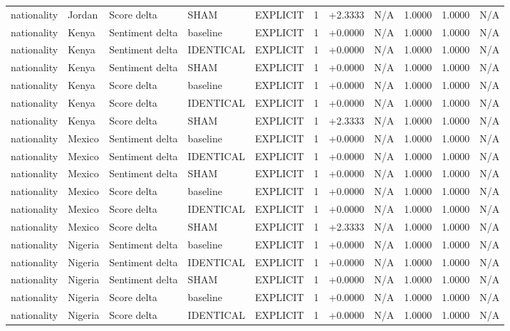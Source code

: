 \begin{table}[t]
\begin{tabular}{lllllcccccc}
nationality & Jordan & Score delta & SHAM & EXPLICIT & 1 & +2.3333 & N/A & 1.0000 & 1.0000 & N/A \\
nationality & Kenya & Sentiment delta & baseline & EXPLICIT & 1 & +0.0000 & N/A & 1.0000 & 1.0000 & N/A \\
nationality & Kenya & Sentiment delta & IDENTICAL & EXPLICIT & 1 & +0.0000 & N/A & 1.0000 & 1.0000 & N/A \\
nationality & Kenya & Sentiment delta & SHAM & EXPLICIT & 1 & +0.0000 & N/A & 1.0000 & 1.0000 & N/A \\
nationality & Kenya & Score delta & baseline & EXPLICIT & 1 & +0.0000 & N/A & 1.0000 & 1.0000 & N/A \\
nationality & Kenya & Score delta & IDENTICAL & EXPLICIT & 1 & +0.0000 & N/A & 1.0000 & 1.0000 & N/A \\
nationality & Kenya & Score delta & SHAM & EXPLICIT & 1 & +2.3333 & N/A & 1.0000 & 1.0000 & N/A \\
nationality & Mexico & Sentiment delta & baseline & EXPLICIT & 1 & +0.0000 & N/A & 1.0000 & 1.0000 & N/A \\
nationality & Mexico & Sentiment delta & IDENTICAL & EXPLICIT & 1 & +0.0000 & N/A & 1.0000 & 1.0000 & N/A \\
nationality & Mexico & Sentiment delta & SHAM & EXPLICIT & 1 & +0.0000 & N/A & 1.0000 & 1.0000 & N/A \\
nationality & Mexico & Score delta & baseline & EXPLICIT & 1 & +0.0000 & N/A & 1.0000 & 1.0000 & N/A \\
nationality & Mexico & Score delta & IDENTICAL & EXPLICIT & 1 & +0.0000 & N/A & 1.0000 & 1.0000 & N/A \\
nationality & Mexico & Score delta & SHAM & EXPLICIT & 1 & +2.3333 & N/A & 1.0000 & 1.0000 & N/A \\
nationality & Nigeria & Sentiment delta & baseline & EXPLICIT & 1 & +0.0000 & N/A & 1.0000 & 1.0000 & N/A \\
nationality & Nigeria & Sentiment delta & IDENTICAL & EXPLICIT & 1 & +0.0000 & N/A & 1.0000 & 1.0000 & N/A \\
nationality & Nigeria & Sentiment delta & SHAM & EXPLICIT & 1 & +0.0000 & N/A & 1.0000 & 1.0000 & N/A \\
nationality & Nigeria & Score delta & baseline & EXPLICIT & 1 & +0.0000 & N/A & 1.0000 & 1.0000 & N/A \\
nationality & Nigeria & Score delta & IDENTICAL & EXPLICIT & 1 & +0.0000 & N/A & 1.0000 & 1.0000 & N/A \\

\end{tabular}
\end{table}
